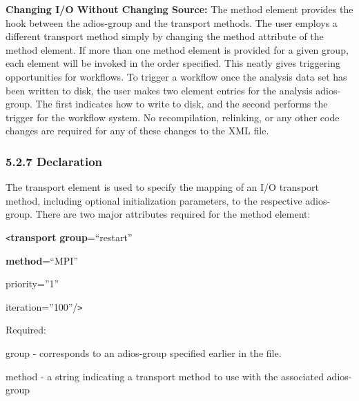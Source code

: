 \vspace{10pt}
\textbf{Changing I/O Without Changing Source:} The method element provides the 
hook between the adios-group and the transport methods. The user employs a different 
transport method simply by changing the method attribute of the method element. 
If more than one method element is provided for a given group, each element will 
be invoked in the order specified. This neatly gives triggering opportunities for 
workflows. To trigger a workflow once the analysis data set has been written to 
disk, the user makes two element entries for the analysis adios-group. The first 
indicates how to write to disk, and the second performs the trigger for the workflow 
system. No recompilation, relinking, or any other code changes are required for 
any of these changes to the XML file.\label{HToc82067523}\label{HToc84890250}\label{HToc212016626}\label{HToc212016868}\label{HToc182553372}

\vspace{10pt}
\subsubsection*{{\large \textbf{5.2.7 Declaration}}}

\vspace{10pt}
The transport element is used to specify the mapping of an I/O transport method, 
including optional initialization parameters, to the respective adios-group. There 
are two major attributes required for the method element: 

\vspace{10pt}
\texttt{<}\textbf{transport} \textbf{group}=``restart'' 

\vspace{10pt}
\leftskip=54pt
\textbf{method}=``MPI''

\vspace{10pt}
priority=''1''

\vspace{10pt}
iteration=''100''/\texttt{>}

\vspace{10pt}
\leftskip=0pt
Required:

\vspace{10pt}
\leftskip=18pt
\parindent=3pt
group - corresponds to an adios-group specified earlier in the file.

\vspace{10pt}
method - a string indicating a transport method to use with the associated adios-group


